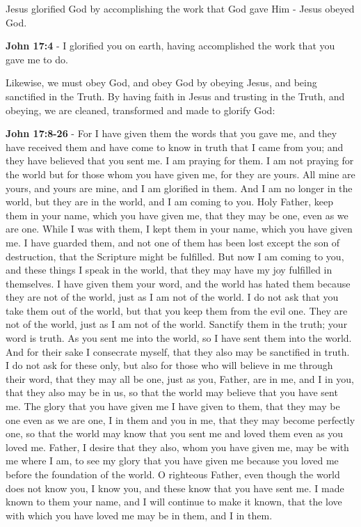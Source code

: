 \documentclass[11pt]{article}
\begin{document}
Jesus glorified God by accomplishing the work that God gave Him - Jesus obeyed God.

\textbf{John 17:4} - I glorified you on earth, having accomplished the work that you gave me to do.

Likewise, we must obey God, and obey God by obeying Jesus, and being sanctified in the Truth. By having faith in Jesus and trusting in the Truth, and obeying, we are cleaned, transformed and made to glorify God:

\textbf{John 17:8-26} - For I have given them the words that you gave me, and they have received them and have come to know in truth that I came from you; and they have believed that you sent me.  I am praying for them. I am not praying for the world but for those whom you have given me, for they are yours.  All mine are yours, and yours are mine, and I am glorified in them.  And I am no longer in the world, but they are in the world, and I am coming to you. Holy Father, keep them in your name, which you have given me, that they may be one, even as we are one.  While I was with them, I kept them in your name, which you have given me. I have guarded them, and not one of them has been lost except the son of destruction, that the Scripture might be fulfilled.  But now I am coming to you, and these things I speak in the world, that they may have my joy fulfilled in themselves.  I have given them your word, and the world has hated them because they are not of the world, just as I am not of the world.  I do not ask that you take them out of the world, but that you keep them from the evil one.  They are not of the world, just as I am not of the world.  Sanctify them in the truth; your word is truth.  As you sent me into the world, so I have sent them into the world.  And for their sake I consecrate myself, that they also may be sanctified in truth.  I do not ask for these only, but also for those who will believe in me through their word, that they may all be one, just as you, Father, are in me, and I in you, that they also may be in us, so that the world may believe that you have sent me.  The glory that you have given me I have given to them, that they may be one even as we are one, I in them and you in me, that they may become perfectly one, so that the world may know that you sent me and loved them even as you loved me.  Father, I desire that they also, whom you have given me, may be with me where I am, to see my glory that you have given me because you loved me before the foundation of the world.  O righteous Father, even though the world does not know you, I know you, and these know that you have sent me.  I made known to them your name, and I will continue to make it known, that the love with which you have loved me may be in them, and I in them.
\end{document}
